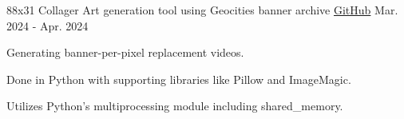 \begin{cventries}
\cventry
{88x31 Collager} %
{Art generation tool using Geocities banner archive} %
{\href{https://github.com/JohnnySn0w/8831-collager}{GitHub}} %
{Mar. 2024 - Apr. 2024} %
{
  \begin{cvitems} %
    \item {Generating banner-per-pixel replacement videos.}
    \item {Done in Python with supporting libraries like Pillow and ImageMagic.}
    \item {Utilizes Python's multiprocessing module including shared\_memory.}
  \end{cvitems}
}

\end{cventries}
